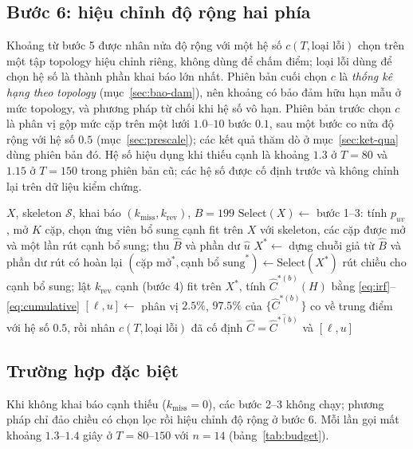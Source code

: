 \subsection{Bước 6: hiệu chỉnh độ rộng hai phía}
Khoảng từ bước 5 được nhân nửa độ rộng với một hệ số $c(T,\text{loại lỗi})$ chọn trên một tập topology hiệu chỉnh riêng, không dùng để chấm điểm; loại lỗi dùng để chọn hệ số là thành phần khai báo lớn nhất. Phiên bản cuối chọn $c$ là \emph{thống kê hạng theo topology} (mục~\ref{sec:bao-dam}), nên khoảng có bảo đảm hữu hạn mẫu ở mức topology, và phương pháp từ chối khi hệ số vô hạn. Phiên bản trước chọn $c$ là phân vị gộp mức cặp trên một lưới $1.0$--$10$ bước $0.1$, sau một bước co nửa độ rộng với hệ số $0.5$ (mục~\ref{sec:prescale}); các kết quả thăm dò ở mục~\ref{sec:ket-qua} dùng phiên bản đó. Hệ số hiệu dụng khi thiếu cạnh là khoảng $1.3$ ở $T=80$ và $1.15$ ở $T=150$ trong phiên bản cũ; các hệ số được cố định trước và không chỉnh lại trên dữ liệu kiểm chứng.

\begin{algorithm}[H]
\caption{\ours{}}
\begin{algorithmic}[1]
\Require $X$, skeleton $\mathcal S$, khai báo $(k_{\text{miss}},k_{\text{rev}})$, $B=199$
\State $\mathrm{Select}(X)\gets$ bước 1--3: tính $p_{uv}$, mở $K$ cặp, chọn ứng viên bổ sung cạnh
\State fit trên $X$ với skeleton, các cặp được mở và một lần rút cạnh bổ sung; thu $\hat B$ và phần dư $\hat u$
  \State $X^*\gets$ dựng chuỗi giả từ $\hat B$ và phần dư rút có hoàn lại
  \State $(\text{cặp mở}^*,\text{cạnh bổ sung}^*)\gets \mathrm{Select}(X^*)$ 
  \State rút chiều cho cạnh bổ sung; lật $k_{\text{rev}}$ cạnh (bước 4)
  \State fit trên $X^*$, tính $\hat C^{*(b)}(H)$ bằng \eqref{eq:irf}--\eqref{eq:cumulative}
\EndFor
\State $[\ell,u]\gets$ phân vị $2.5\%$, $97.5\%$ của $\{\hat C^{*(b)}\}$
\State co về trung điểm với hệ số $0.5$, rồi nhân $c(T,\text{loại lỗi})$ đã cố định
\State \Return $\hat C=\overline{\hat C^{*(b)}}$ và $[\ell,u]$
\end{algorithmic}
\end{algorithm}

\subsection{Trường hợp đặc biệt}
Khi không khai báo cạnh thiếu ($k_{\text{miss}}=0$), các bước 2--3 không chạy; phương pháp chỉ đảo chiều có chọn lọc rồi hiệu chỉnh độ rộng ở bước 6. Mỗi lần gọi mất khoảng $1.3$--$1.4$ giây ở $T=80$--$150$ với $n=14$ (bảng~\ref{tab:budget}).
